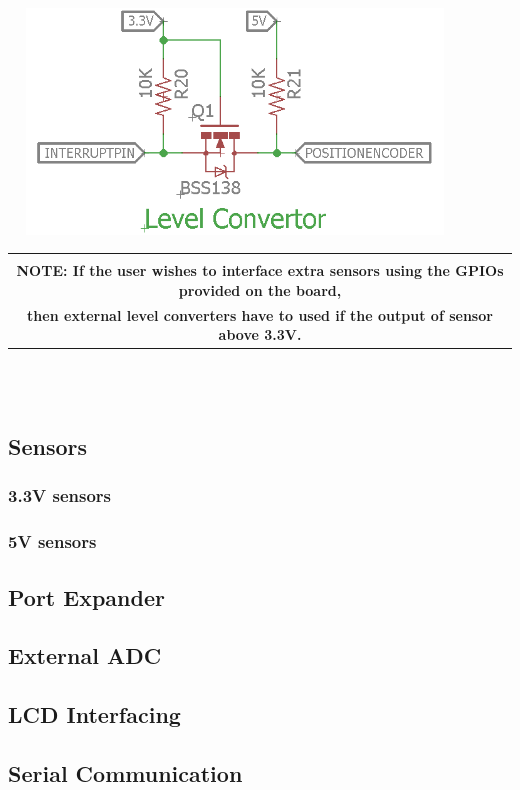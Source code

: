 \documentclass[a4paper,10pt,oneside]{article}
\begin{document}
{	\hspace{3.5cm}
	\includegraphics[width=12cm, height=6cm]{Level_Converter}\\
	\begin{tabular}{|c|}
		\hline
		\\
		\textbf{NOTE: If the user wishes to interface extra sensors using the GPIOs provided on the board,} \\ \textbf{then external level converters have to used if the output of sensor above 3.3V.}
		\\
		\hline
	\end{tabular}\\\\
	\subsection{\huge \textbf{Sensors}} %
		\subsubsection{\Large \textbf{3.3V sensors}}
		
		\subsubsection{\Large \textbf{5V sensors}}
	\subsection{\huge \textbf{Port Expander}}
	\subsection{\huge \textbf{External ADC}}
	\subsection{\huge \textbf{LCD Interfacing}}
	\subsection{\huge \textbf{Serial Communication}}
}
\end{document}
